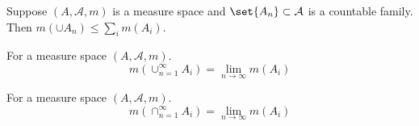 \begin{proposition}[subaddivity]
Suppose $(A, \mathcal{A} , m)$ is a measure space and $\set{A_n} \subset \mathcal{A} $ is a countable family.
Then $m(\cup A_n) \leq \sum_{i} m(A_i)$.
\end{proposition}

\begin{proposition}
For a measure space $(A, \mathcal{A} , m)$.
\[
m(\cup_{n = 1}^{\infty} A_i) = \lim_{n \to \infty} m(A_i)
\]
\end{proposition}

\begin{proposition}
For a measure space $(A, \mathcal{A} , m)$.
\[
m(\cap _{n = 1}^{\infty} A_i) = \lim_{n \to \infty} m(A_i)
\]
\end{proposition}
